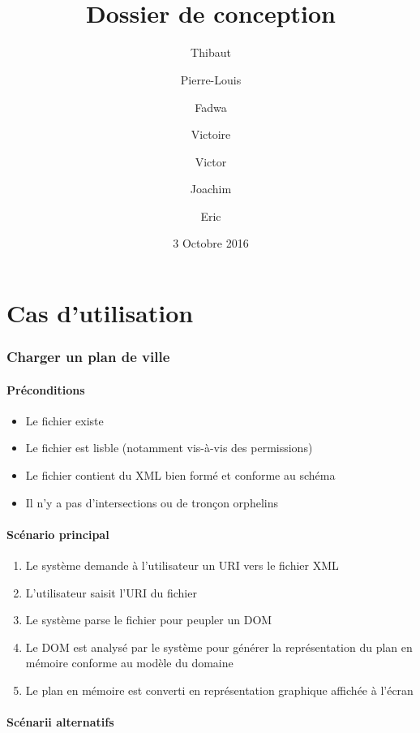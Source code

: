 \documentclass{article}
\title{\bsc{PLD Agile} \\ Dossier de conception}
\author{Thibaut \bsc{Fernandez} \and Pierre-Louis \bsc{Lefebvre} \and Fadwa \bsc{Messaoudi} \and Victoire \bsc{Chapelle} \and Victor \bsc{Capelle} \and Joachim \bsc{Dorel} \and Eric \bsc{Jordan}}
\date{3 Octobre 2016}
\begin{document}
\maketitle
\tableofcontents

\part{Cas d'utilisation}

\section{Charger un plan de ville}

\subsection{Préconditions}

\begin{itemize}
\item Le fichier existe
\item Le fichier est lisble (notamment vis-à-vis des permissions)
\item Le fichier contient du XML bien formé et conforme au schéma
\item Il n'y a pas d'intersections ou de tronçon orphelins
\end{itemize}

\subsection{Scénario principal}

\begin{enumerate}
\item Le système demande à l'utilisateur un URI vers le fichier XML
\item L'utilisateur saisit l'URI du fichier
\item Le système parse le fichier pour peupler un DOM
\item Le DOM est analysé par le système pour générer la représentation du plan en mémoire conforme au modèle du domaine
\item Le plan en mémoire est converti en représentation graphique affichée à l'écran
\end{enumerate}

\subsection{Scénarii alternatifs}
\end{document}

